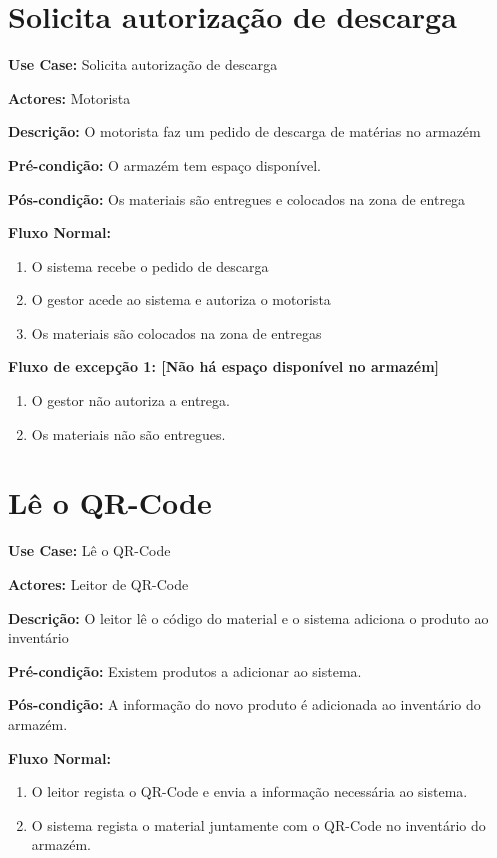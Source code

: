 \documentclass[a4paper]{report}
\begin{document}
\section{Solicita autorização de descarga}

\textbf{Use Case:} Solicita autorização de descarga

\textbf{Actores:} Motorista

\textbf{Descrição:} O motorista faz um pedido de descarga de matérias no armazém 

\textbf{Pré-condição:}  O armazém tem espaço disponível.

\textbf{Pós-condição:} Os materiais são entregues e colocados na zona de entrega

\textbf{Fluxo Normal:} 
\begin{enumerate}
    
    \item  O sistema recebe o pedido de descarga 
    \item O gestor acede ao sistema e autoriza o motorista 
    \item Os materiais são colocados na zona de entregas
\end{enumerate}

\textbf{Fluxo de excepção 1: [Não há espaço disponível no armazém]} 

\begin{enumerate}

    \item  O gestor não autoriza a entrega. 
    \item Os materiais não são entregues. 

\end{enumerate}

\newpage

\section{Lê o QR-Code}

\textbf{Use Case:} Lê o QR-Code

\textbf{Actores:} Leitor de QR-Code

\textbf{Descrição:} O leitor lê o código do material e o sistema adiciona o produto ao inventário 

\textbf{Pré-condição:}  Existem produtos a adicionar ao sistema.

\textbf{Pós-condição:} A informação do novo produto é adicionada ao inventário do armazém.

\textbf{Fluxo Normal:} 
\begin{enumerate}

    \item  O leitor regista o QR-Code e envia a informação necessária ao sistema. 
    \item O sistema regista o material juntamente com o QR-Code no inventário do armazém.

\end{enumerate}
\end{document}
